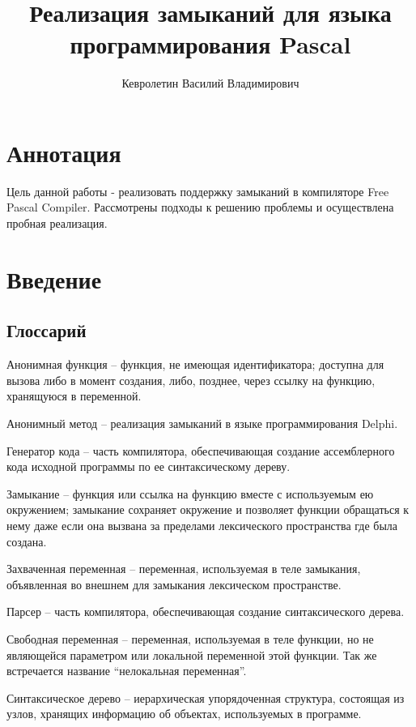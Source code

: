 \documentclass{imcs}
\title{Реализация замыканий для языка программирования Pascal}
\author{Кевролетин Василий Владимирович}
\begin{document}
\maketitle

\tableofcontents
\pagebreak

\section*{Аннотация}
Цель данной работы - реализовать поддержку замыканий в компиляторе Free Pascal Compiler.
Рассмотрены подходы к решению проблемы и осуществлена пробная реализация.

\pagebreak

\section{Введение}
\subsection{Глоссарий}

Анонимная функция -- функция, не имеющая идентификатора; доступна для
вызова либо в момент создания, либо, позднее, через ссылку на функцию,
хранящуюся в переменной.

Анонимный метод -- реализация замыканий в языке программирования Delphi. 

Генератор кода -- часть компилятора, обеспечивающая создание
ассемблерного кода исходной программы по ее синтаксическому дереву.

Замыкание -- функция или ссылка на функцию вместе с используемым ею
окружением; замыкание сохраняет окружение и позволяет функции
обращаться к нему даже если она вызвана за пределами лексического
пространства где была создана.

Захваченная переменная -- переменная, используемая в теле замыкания,
объявленная во внешнем для замыкания лексическом пространстве.

Парсер -- часть компилятора, обеспечивающая создание синтаксического
дерева.

Свободная переменная -- переменная, используемая в теле функции, но не
являющейся параметром или локальной переменной этой функции. Так же встречается название
``нелокальная переменная''.

Синтаксическое дерево -- иерархическая упорядоченная структура,
состоящая из узлов, хранящих информацию об объектах, используемых в
программе.
\end{document}

